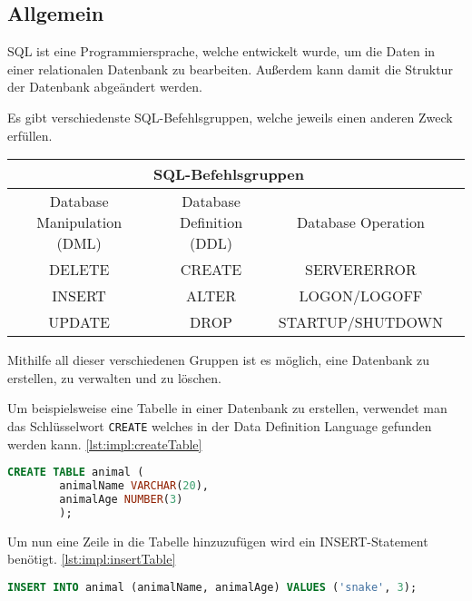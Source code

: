 \subsection{Allgemein}
SQL ist eine Programmiersprache, welche entwickelt wurde, um die Daten in einer relationalen Datenbank zu bearbeiten. Außerdem kann damit die Struktur der Datenbank abgeändert werden. 

Es gibt verschiedenste SQL-Befehlsgruppen, welche jeweils einen anderen Zweck erfüllen.

\begin{center}
    \begin{tabular}{ |c|c|c|c| } 
     \hline
     \multicolumn{3}{|c|}{SQL-Befehlsgruppen } \\
     \hline
     \hline
     Database Manipulation (DML)  & Database Definition (DDL) & Database Operation  \\ 
     \hline 
     \hline
     DELETE & CREATE & SERVERERROR \\ 
     \hline
     INSERT & ALTER & LOGON/LOGOFF \\ 
     \hline
     UPDATE & DROP & STARTUP/SHUTDOWN \\ 
     \hline
    \end{tabular}
    \end{center}

Mithilfe all dieser verschiedenen Gruppen ist es möglich, eine Datenbank zu erstellen, zu verwalten und zu löschen. 

Um beispielsweise eine Tabelle in einer Datenbank zu erstellen, verwendet man das Schlüsselwort \texttt{CREATE} welches in der Data Definition Language gefunden werden kann. \ref{lst:impl:createTable}

\begin{lstlisting}[language=sql,caption=CREATE table,label=lst:impl:createTable]
    CREATE TABLE animal (
        animalName VARCHAR(20),
        animalAge NUMBER(3)
        );
\end{lstlisting}

Um nun eine Zeile in die Tabelle hinzuzufügen wird ein INSERT-Statement benötigt. \ref{lst:impl:insertTable}

\begin{lstlisting}[language=sql,caption=CREATE table,label=lst:impl:insertTable]
        INSERT INTO animal (animalName, animalAge) VALUES ('snake', 3);
\end{lstlisting}

